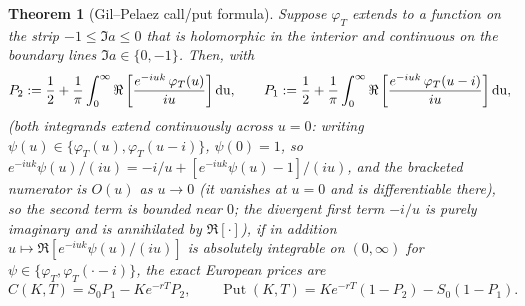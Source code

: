 \documentclass{article}
\newcommand{\assign}{:=}
\newcommand{\tmem}[1]{{\em #1\/}}
\newcommand{\tmop}[1]{\ensuremath{\operatorname{#1}}}
\newtheorem{theorem}{Theorem}
\begin{document}
\begin{theorem}
  [Gil--Pelaez call/put formula]\label{thm:callput} Suppose $\varphi_T$
  extends to a function on the strip $- 1 \le \Im  a \le 0$ that is
  holomorphic in the interior and continuous on the boundary lines $\Im  a
  \in \{ 0, - 1 \}$. Then, with
  \[ P_2 \assign \frac{1}{2} + \frac{1}{\pi} \int_0^{\infty} \Re \left[
     \frac{e^{- iuk}  \hspace{0.17em} \varphi_T (u)}{iu} \right] \tmop{du},
     \qquad P_1 \assign \frac{1}{2} + \frac{1}{\pi} \int_0^{\infty} \Re
     \left[ \frac{e^{- iuk}  \hspace{0.17em} \varphi_T (u - i)}{iu} \right]
     \tmop{du}, \]
  {\tmem{(}}both integrands extend continuously across $u = 0$: writing
  $\psi (u) \in \{ \varphi_T (u), \varphi_T (u - i) \}$, $\psi (0) = 1$, so
  $e^{- iuk} \psi (u) / (iu) = - i / u + \left[ e^{- iuk} \psi (u) - 1
  \right] / (iu)$, and the bracketed numerator is $O (u)$ as $u \to 0$ (it
  vanishes at $u = 0$ and is differentiable there), so the second term is
  bounded near $0$; the divergent first term $- i/u$ is purely imaginary and
  is annihilated by $\Re [\cdot]${\tmem{)}}, if in addition $u \mapsto \Re
  [e^{- iuk} \psi (u) / (iu) ]$ is absolutely integrable on $(0, \infty)$ for
  $\psi \in \{ \varphi_T, \varphi_T (\cdot - i) \}$, the exact European
  prices are
  \[ C (K, T) = S_0 P_1 - K e^{- rT} P_2, \qquad \tmop{Put} (K, T) = K e^{-
     rT} (1 - P_2) - S_0 (1 - P_1) . \]
\end{theorem}
\end{document}
